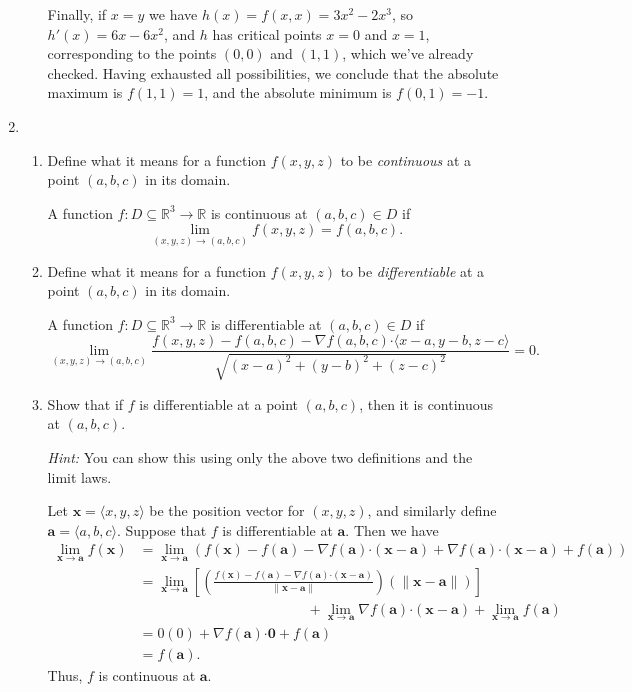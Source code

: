 \documentclass[12pt]{article}
\newcommand{\points}[1]{\marginpar{\hspace{24pt}[#1]}}
\newcommand{\R}{\mathbb{R}}
\newcommand{\aaa}{\mathbf{a}}
\newcommand{\x}{\mathbf{x}}
\newcommand{\dotp}{\boldsymbol{\cdot}}
\begin{document}
\begin{enumerate}
\begin{enumerate}
Finally, if $x=y$ we have $h(x) = f(x,x) = 3x^2-2x^3$, so $h'(x) = 6x-6x^2$, and $h$ has critical points $x=0$ and $x=1$, corresponding to the points $(0,0)$ and $(1,1)$, which we've already checked. Having exhausted all possibilities, we conclude that the absolute maximum is $f(1,1)=1$, and the absolute minimum is $f(0,1)=-1$.
\end{enumerate}
\newpage

\item \begin{enumerate}
\item Define what it means for a function $f(x,y,z)$ to be {\em continuous} at a point $(a,b,c)$ in its domain. \points{2}

\bigskip

A function $f:D\subseteq \R^3\to \R$ is continuous at $(a,b,c)\in D$ if 
\[
\lim_{(x,y,z)\to (a,b,c)}f(x,y,z) = f(a,b,c).
\]

\bigskip


\item Define what it means for a function $f(x,y,z)$ to be {\em differentiable} at a point $(a,b,c)$ in its domain. \points{3}

\bigskip

A function $f:D\subseteq \R^3\to \R$ is differentiable at $(a,b,c)\in D$ if
\[
\lim_{(x,y,z)\to (a,b,c)}\frac{f(x,y,z)-f(a,b,c)-\nabla f(a,b,c)\dotp \langle x-a, y-b, z- c\rangle}{\sqrt{(x-a)^2+(y-b)^2+(z-c)^2}}=0.
\]

\bigskip

\item Show that if $f$ is differentiable at a point $(a,b,c)$, then it is continuous at $(a,b,c)$.\points{5}

{\em Hint:} You can show this using only the above two definitions and the limit laws.

\bigskip

Let $\x=\langle x,y,z\rangle$ be the position vector for $(x,y,z)$, and similarly define $\aaa=\langle a,b,c\rangle$. Suppose that $f$ is differentiable at $\aaa$. Then we have
\begin{align*}
\lim_{\x\to\aaa}f(\x) & = \lim_{\x\to\aaa}\left(f(\x)-f(\aaa)-\nabla f(\aaa)\dotp (\x-\aaa) + \nabla f(\aaa)\dotp (\x-\aaa) + f(\aaa)\right)\\
& = \lim_{\x\to\aaa}\left[\left(\frac{f(\x)-f(\aaa)-\nabla f(\aaa)\dotp (\x-\aaa)}{\lVert \x-\aaa\rVert}\right)(\lVert \x-\aaa\rVert)\right]\\
& \hspace{2in} + \lim_{\x\to\aaa}\nabla f(\aaa)\dotp (\x-\aaa) + \lim_{\x\to\aaa}f(\aaa)\\
& = 0(0) + \nabla f(\aaa)\dotp \mathbf{0} +f(\aaa)\\
& = f(\aaa).
\end{align*}
Thus, $f$ is continuous at $\aaa$.
\end{enumerate}
\end{enumerate}
\end{document}
